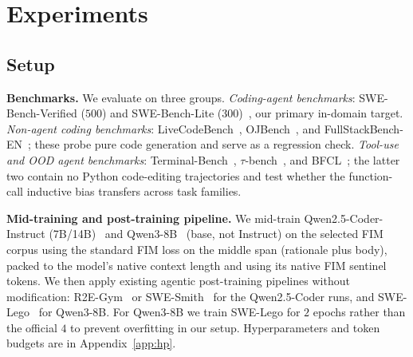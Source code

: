 
\section{Experiments}
\label{sec:exp}
\vspace{-0.5ex}

\subsection{Setup}
\label{sec:exp:setup}

\textbf{Benchmarks.} We evaluate on three groups.
\emph{Coding-agent benchmarks}: SWE-Bench-Verified ($500$) and
SWE-Bench-Lite ($300$)~\citep{swebench}, our primary in-domain target.
\emph{Non-agent coding benchmarks}: LiveCodeBench~\citep{livecodebench},
OJBench~\citep{ojbench}, and FullStackBench-EN~\citep{fullstackbench};
these probe pure code generation and serve as a regression check.
\emph{Tool-use and OOD agent benchmarks}: Terminal-Bench~\citep{terminalbench},
$\tau$-bench~\citep{taubench}, and BFCL~\citep{bfcl}; the latter two
contain no Python code-editing trajectories and test whether the
function-call inductive bias transfers across task families.

\textbf{Mid-training and post-training pipeline.}
We mid-train Qwen2.5-Coder-Instruct (7B/14B)~\citep{qwencoder} and
Qwen3-8B~\citep{qwen3} (base, not Instruct) on the selected FIM corpus
using the standard FIM loss on the middle span
(rationale plus body), packed to the model's native context length and
using its native FIM sentinel tokens. We then apply existing agentic
post-training pipelines without modification:
R2E-Gym~\citep{r2egym} or SWE-Smith~\citep{swesmith} for the
Qwen2.5-Coder runs, and SWE-Lego~\citep{swelego} for Qwen3-8B. For
Qwen3-8B we train SWE-Lego for $2$ epochs rather than the official $4$
to prevent overfitting in our setup. Hyperparameters and token budgets
are in Appendix~\ref{app:hp}.

